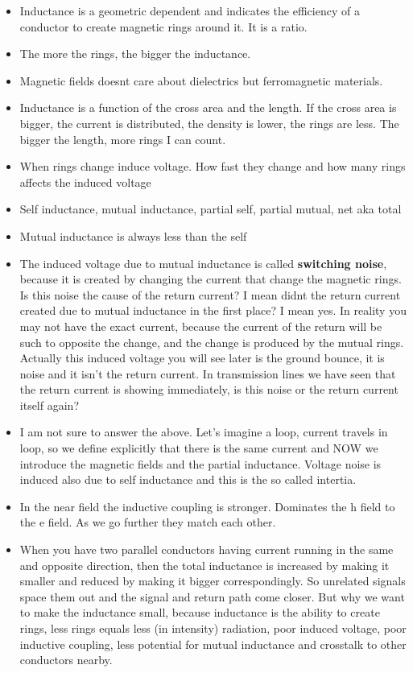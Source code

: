 \documentclass[12pt]{article}
\begin{document}
\begin{itemize}
	\item Inductance is a geometric dependent and indicates the efficiency of a conductor to create magnetic rings around it. It is a ratio.
	\item The more the rings, the bigger the inductance.
	\item Magnetic fields doesnt care about dielectrics but ferromagnetic materials.
	\item Inductance is a function of the cross area and the length. If the cross area is bigger, the current is distributed, the density is lower, the rings are less. The bigger the length, more rings I can count.
	\item When rings change induce voltage. How fast they change and how many rings affects the induced voltage
	\item Self inductance, mutual inductance, partial self, partial mutual, net aka total
	\item Mutual inductance is always less than the self
	\item The induced voltage due to mutual inductance is called \textbf{switching noise}, because it is created by changing the current that change the magnetic rings. Is this noise the cause of the return current? I mean didnt the return current created due to mutual inductance in the first place? I mean yes. In reality you may not have the exact current, because the current of the return will be such to opposite the change, and the change is produced by the mutual rings. Actually this induced voltage you will see later is the ground bounce, it is noise and it isn't the return current. In transmission lines we have seen that the return current is showing immediately, is this noise or the return current itself again?
	\item I am not sure to answer the above. Let's imagine a loop, current travels in loop, so we define explicitly that there is the same current and NOW we introduce the magnetic fields and the partial inductance. Voltage noise is induced also due to self inductance and this is the so called intertia.
	\item In the near field the inductive coupling is stronger. Dominates the h field to the e field. As we go further they match each other.
	\item When you have two parallel conductors having current running in the same and opposite direction, then the total inductance is increased by making it smaller and reduced by making it bigger correspondingly. So unrelated signals space them out and the signal and return path come closer. But why we want to make the inductance small, because inductance is the ability to create rings, less rings equals less (in intensity) radiation, poor induced voltage, poor inductive coupling, less potential for mutual inductance and crosstalk to other conductors nearby.

\end{itemize}
\end{document}
